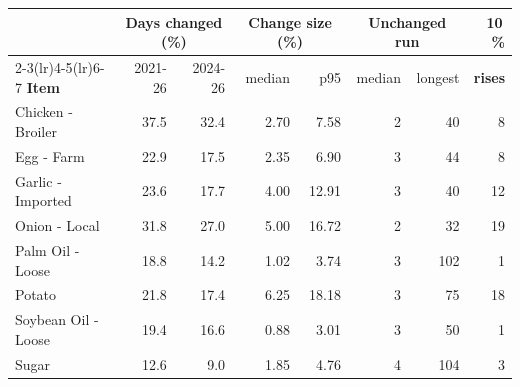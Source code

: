 \begin{tabular}{lrrrrrrr}
\toprule
 & \multicolumn{2}{c}{\textbf{Days changed (\%)}} & \multicolumn{2}{c}{\textbf{Change size (\%)}} & \multicolumn{2}{c}{\textbf{Unchanged run}} & \textbf{10\,\%} \\
\cmidrule(lr){2-3}\cmidrule(lr){4-5}\cmidrule(lr){6-7}
\textbf{Item} & 2021-26 & 2024-26 & median & p95 & median & longest & \textbf{rises} \\
\midrule
Chicken - Broiler & 37.5 & 32.4 & 2.70 & 7.58 & 2 & 40 & 8 \\
Egg - Farm & 22.9 & 17.5 & 2.35 & 6.90 & 3 & 44 & 8 \\
Garlic - Imported & 23.6 & 17.7 & 4.00 & 12.91 & 3 & 40 & 12 \\
Onion - Local & 31.8 & 27.0 & 5.00 & 16.72 & 2 & 32 & 19 \\
Palm Oil - Loose & 18.8 & 14.2 & 1.02 & 3.74 & 3 & 102 & 1 \\
Potato & 21.8 & 17.4 & 6.25 & 18.18 & 3 & 75 & 18 \\
Soybean Oil - Loose & 19.4 & 16.6 & 0.88 & 3.01 & 3 & 50 & 1 \\
Sugar & 12.6 & 9.0 & 1.85 & 4.76 & 4 & 104 & 3 \\
\bottomrule
\end{tabular}
